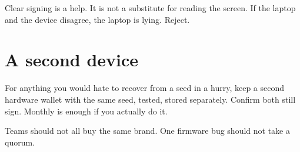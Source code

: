 Clear signing is a help. It is not a substitute for
reading the screen. If the laptop and the device
disagree, the laptop is lying. Reject.

\section{A second device}

For anything you would hate to recover from a seed in a
hurry, keep a second hardware wallet with the same seed,
tested, stored separately. Confirm both still sign.
Monthly is enough if you actually do it.

Teams should not all buy the same brand. One firmware
bug should not take a quorum.
